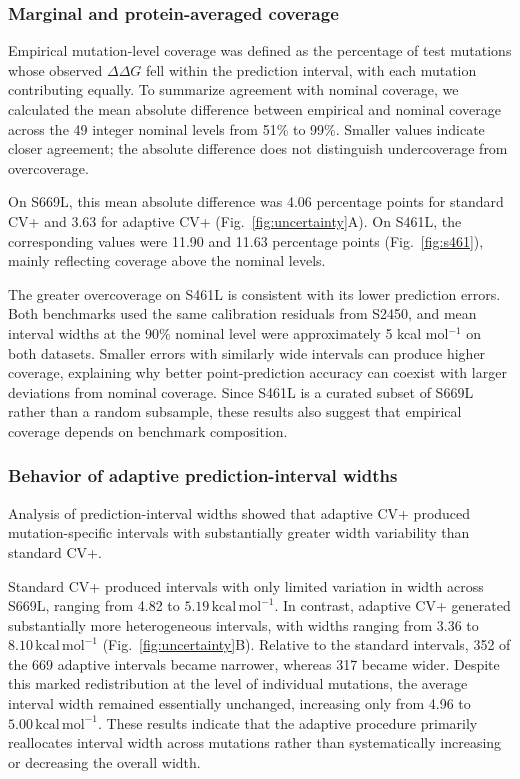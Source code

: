 \documentclass[11pt]{article}
\begin{document}
\subsubsection{Marginal and protein-averaged coverage}

Empirical mutation-level coverage was defined as the percentage of test mutations whose observed $\Delta\Delta G$ fell within the prediction interval, with each mutation contributing equally. To summarize agreement with nominal coverage, we calculated the mean absolute difference between empirical and nominal coverage across the 49 integer nominal levels from 51\% to 99\%. Smaller values indicate closer agreement; the absolute difference does not distinguish undercoverage from overcoverage.

On S669L, this mean absolute difference was 4.06 percentage points for standard CV+ and 3.63 for adaptive CV+ (Fig.~\ref{fig:uncertainty}A). On S461L, the corresponding values were 11.90 and 11.63 percentage points (Fig.~\ref{fig:s461}), mainly reflecting coverage above the nominal levels.

The greater overcoverage on S461L is consistent with its lower prediction errors. Both benchmarks used the same calibration residuals from S2450, and mean interval widths at the 90\% nominal level were approximately 5 kcal mol$^{-1}$ on both datasets. Smaller errors with similarly wide intervals can produce higher coverage, explaining why better point-prediction accuracy can coexist with larger deviations from nominal coverage. Since S461L is a curated subset of S669L rather than a random subsample, these results also suggest that empirical coverage depends on benchmark composition.



\subsubsection{Behavior of adaptive prediction-interval widths}

Analysis of prediction-interval widths showed that adaptive CV+ produced mutation-specific intervals with substantially greater width variability than standard CV+.

Standard CV+ produced intervals with only limited variation in width across S669L, ranging from 4.82 to $5.19\,\mathrm{kcal\,mol^{-1}}$. 
In contrast, adaptive CV+ generated substantially more heterogeneous intervals, with widths ranging from 3.36 to $8.10\,\mathrm{kcal\,mol^{-1}}$ (Fig.~\ref{fig:uncertainty}B). Relative to the standard intervals, 352 of the 669 adaptive intervals became narrower, whereas 317 became wider. Despite this marked redistribution at the level of individual mutations, the average interval width remained essentially unchanged, increasing only from 4.96 to $5.00\,\mathrm{kcal\,mol^{-1}}$. These results indicate that the adaptive procedure primarily reallocates interval width across mutations rather than systematically increasing or decreasing the overall width.
\end{document}
